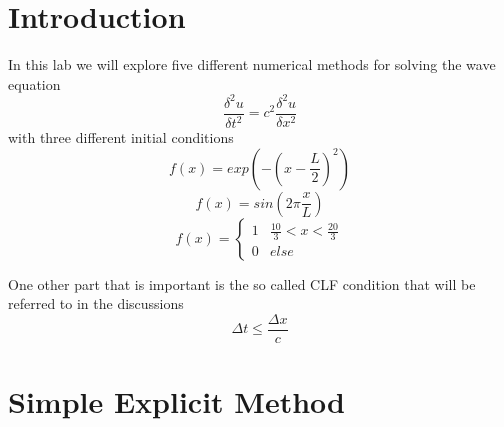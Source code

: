 \documentclass[11pt]{article}
\begin{document}
\section{Introduction}
In this lab we will explore five different numerical methods for solving the wave equation
\begin{equation}
	\frac{\delta^2 u}{\delta t^2} = c^2 \frac{\delta^2 u}{\delta x^2}
\end{equation}
with three different initial conditions
\begin{equation}
	f(x) = exp(-(x-\frac{L}{2})^2)
	\label{eq:normal}
\end{equation}
\begin{equation}
	f(x) = sin( 2 \pi \frac{x}{L})
	\label{eq:sine}
\end{equation}
\begin{equation}
	 f(x) =\begin{cases}1 & \frac{10}{3}<x<\frac{20}{3} \\0 & else\end{cases} 
	\label{eq:square}
\end{equation}

One other part that is important is the so called CLF condition that will be referred to in the discussions
\begin{equation}
	\Delta t  \leq \frac{\Delta x}{c}
	\label{eq:clf}
\end{equation}
\section{Simple Explicit Method}
\end{document}

